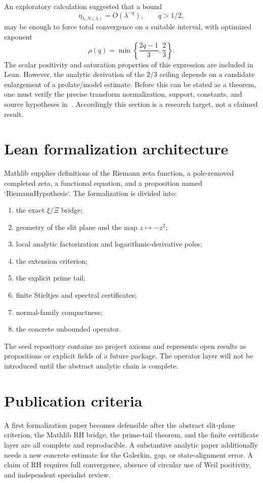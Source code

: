 \documentclass[11pt]{article}
\theoremstyle{definition}
\begin{document}
An exploratory calculation suggested that a bound
\[
\eta_{\lambda,N(\lambda)}=O(\lambda^{-q}),\qquad q>1/2,
\]
may be enough to force total convergence on a suitable interval, with optimized
exponent
\[
\rho(q)=\min\left\{\frac{2q-1}{3},\frac23\right\}.
\]
The scalar positivity and saturation properties of this expression are included
in Lean.  However, the analytic derivation of the $2/3$ ceiling depends on a
candidate enlargement of a prolate/model estimate.  Before this can be stated
as a theorem, one must verify the precise transform normalization, support,
constants, and source hypotheses in~\cite{CCM2025}.  Accordingly this section is
a research target, not a claimed result.

\section{Lean formalization architecture}

Mathlib supplies definitions of the Riemann zeta function, a pole-removed
completed zeta, a functional equation, and a proposition named
`RiemannHypothesis`.  The formalization is divided into:

\begin{enumerate}[label=\arabic*.]
\item the exact $\xi/\Xi$ bridge;
\item geometry of the slit plane and the map $z\mapsto-z^2$;
\item local analytic factorization and logarithmic-derivative poles;
\item the extension criterion;
\item the explicit prime tail;
\item finite Stieltjes and spectral certificates;
\item normal-family compactness;
\item the concrete unbounded operator.
\end{enumerate}

The seed repository contains no project axioms and represents open results as
propositions or explicit fields of a future package.  The operator layer will
not be introduced until the abstract analytic chain is complete.

\section{Publication criteria}

A first formalization paper becomes defensible after the abstract slit-plane
criterion, the Mathlib RH bridge, the prime-tail theorem, and the finite
certificate layer are all complete and reproducible.  A substantive analytic
paper additionally needs a new concrete estimate for the Galerkin, gap, or
state-alignment error.  A claim of RH requires full convergence, absence of
circular use of Weil positivity, and independent specialist review.
\end{document}
